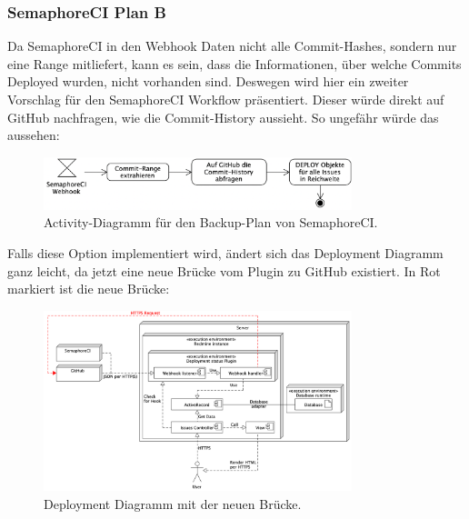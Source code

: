 \subsubsection{SemaphoreCI Plan B}
Da SemaphoreCI in den Webhook Daten nicht alle Commit-Hashes, sondern nur eine Range mitliefert, kann es sein, dass die
Informationen, über welche Commits Deployed wurden, nicht vorhanden sind. Deswegen wird hier ein zweiter Vorschlag für den
SemaphoreCI Workflow präsentiert. Dieser würde direkt auf GitHub nachfragen, wie die Commit-History aussieht. So
ungefähr würde das aussehen:
\begin{figure}[H]
  \centering
  \includegraphics[width=0.8\textwidth]{images/activity/semaphore-backup-hooks.png}
  \caption[Ein Activity-Diagramm, welches den Backup-Plan für SemaphoreCI aufzeigt.]{Activity-Diagramm für den Backup-Plan von SemaphoreCI.}
  \label{fig:activity_plan_b}
\end{figure}
Falls diese Option implementiert wird, ändert sich das Deployment Diagramm ganz leicht, da jetzt
eine neue Brücke vom Plugin zu GitHub existiert. In Rot markiert ist die neue Brücke:
\begin{figure}[H]
  \centering
  \includegraphics[width=0.8\textwidth]{images/deployment/backup-hooks.png}
  \caption[Das Deployment Diagramm aus \ref{fig:deployment-diagram} mit der neuen Brücke in Rot gekennzeichnet.]{Deployment Diagramm mit der neuen Brücke.}
  \label{fig:activity_plan_b_deployment}
\end{figure}

\newpage
